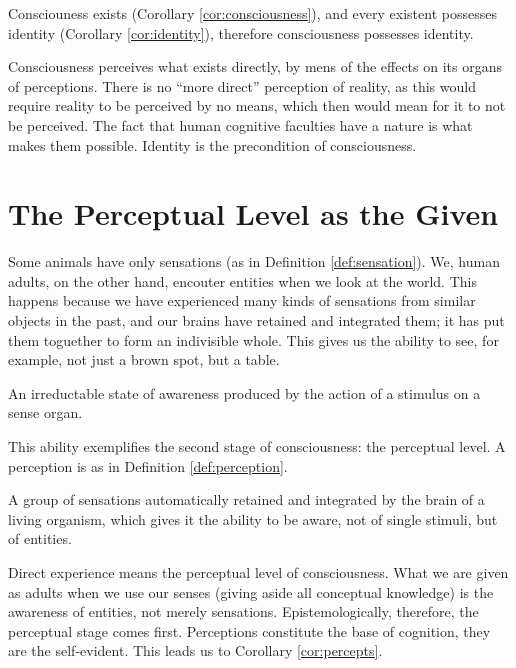             \begin{remark}
                Consciouness exists (Corollary \ref{cor:consciousness}), and every existent possesses identity (Corollary \ref{cor:identity}), therefore consciousness possesses identity.
            \end{remark}
        
        Consciousness perceives what exists directly, by mens of the effects on its organs of perceptions. There is no ``more direct'' perception of reality, as this would require reality to be perceived by no means, which then would mean for it to not be perceived. The fact that human cognitive faculties have a nature is what makes them possible. Identity is the precondition of consciousness.

    \section{The Perceptual Level as the Given}

        Some animals have only sensations (as in Definition \ref{def:sensation}). We, human adults, on the other hand, encouter entities when we look at the world. This happens because we have experienced many kinds of sensations from similar objects in the past, and our brains have retained and integrated them; it has put them toguether to form an indivisible whole. This gives us the ability to see, for example, not just a brown spot, but a table.
            
            \begin{definition}[Sensation]
            \label{def:sensation}
                An irreductable state of awareness produced by the action of a stimulus on a sense organ.
            \end{definition}

        This ability exemplifies the second stage of consciousness: the perceptual level. A perception is as in Definition \ref{def:perception}.

            \begin{definition}[Perception]
            \label{def:perception}
                A group of sensations automatically retained and integrated by the brain of a living organism, which gives it the ability to be aware, not of single stimuli, but of entities.
            \end{definition}

        Direct experience means the perceptual level of consciousness. What we are given as adults when we use our senses (giving aside all conceptual knowledge) is the awareness of entities, not merely sensations. Epistemologically, therefore, the perceptual stage comes first. Perceptions constitute the base of cognition, they are the self-evident. This leads us to Corollary \ref{cor:percepts}.

